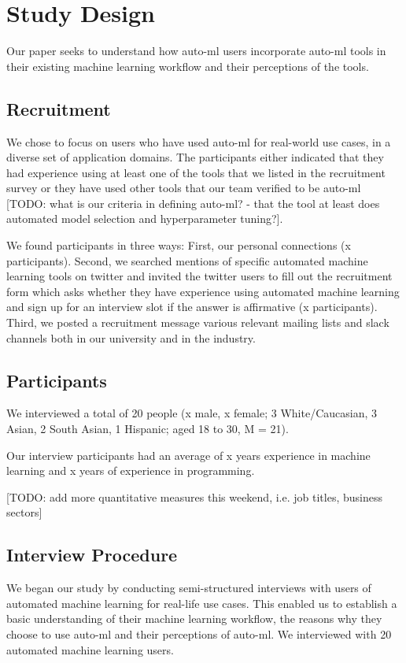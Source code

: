 \section{Study Design}
Our paper seeks to understand how auto-ml users incorporate auto-ml tools in their existing machine learning workflow and their perceptions of the tools. 

\subsection{Recruitment}
We chose to focus on users who have used auto-ml for real-world use cases, in a diverse set of application domains. The participants either indicated that they had experience using at least one of the tools that we listed in the recruitment survey or they have used other tools that our team verified to be auto-ml [TODO: what is our criteria in defining auto-ml? - that the tool at least does automated model selection and hyperparameter tuning?]. 

We found participants in three ways: First, our personal connections (x participants). 
Second, we searched mentions of specific automated machine learning tools on twitter and invited the twitter users to fill out the recruitment form which asks whether they have experience using automated machine learning and sign up for an interview slot if the answer is affirmative (x participants). 
Third, we posted a recruitment message various relevant mailing lists and slack channels both in our university and in the industry. 

\subsection{Participants}
 We interviewed a total of 20 people (x male, x female; 3 White/Caucasian, 3 Asian, 2 South Asian, 1 Hispanic; aged 18 to 30, M = 21). 

Our interview participants had an average of x years experience in machine learning and x years of experience in programming. 

[TODO: add more quantitative measures this weekend, i.e. job titles, business sectors]

\subsection{Interview Procedure}

We began our study by conducting semi-structured interviews with users of automated machine learning for real-life use cases. This enabled us to establish a basic understanding of their machine learning workflow, the reasons why they choose to use auto-ml and their perceptions of auto-ml. We interviewed with 20 automated machine learning users. 

